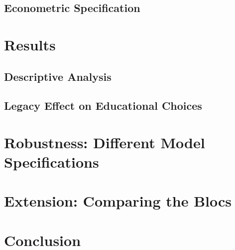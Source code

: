 \documentclass[a4paper, oneside, hyperfootnotes = false]{article}
\begin{document}
{\subsection{Econometric Specification}
\label{specification}

\section{Results}
\label{results}

\subsection{Descriptive Analysis}
\label{descriptives}

\subsection{Legacy Effect on Educational Choices}
\label{educational}

\section{Robustness: Different Model Specifications}
\label{robustness}

\section{Extension: Comparing the Blocs}
\label{Extension}

\section{Conclusion}
\label{conclusion}


{}

\makeatletter %


\label{references}

\makeatother

\vspace{-.3cm}

\clearpage

}
\end{document}
